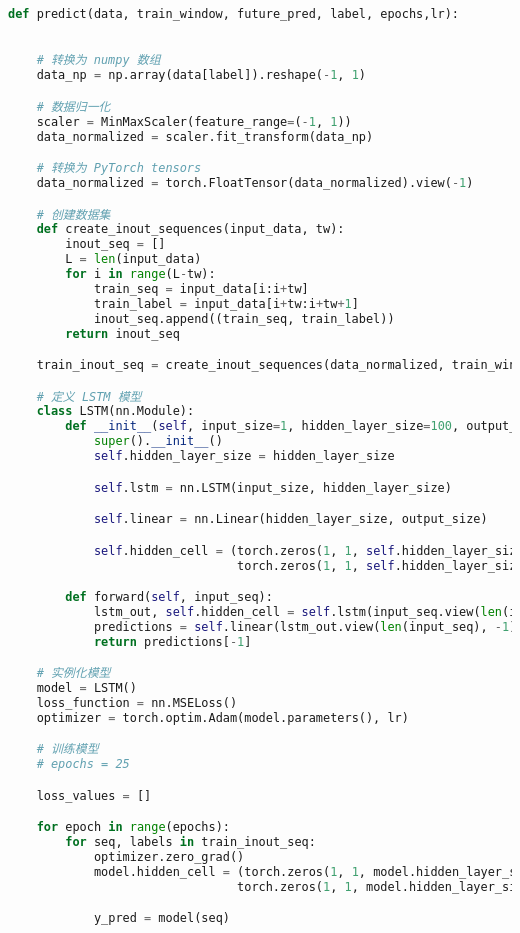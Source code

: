 \begin{lstlisting}[language=python,caption={数字农业渗透}]
def predict(data, train_window, future_pred, label, epochs,lr):

  
    # 转换为 numpy 数组
    data_np = np.array(data[label]).reshape(-1, 1)

    # 数据归一化
    scaler = MinMaxScaler(feature_range=(-1, 1))
    data_normalized = scaler.fit_transform(data_np)

    # 转换为 PyTorch tensors
    data_normalized = torch.FloatTensor(data_normalized).view(-1)

    # 创建数据集
    def create_inout_sequences(input_data, tw):
        inout_seq = []
        L = len(input_data)
        for i in range(L-tw):
            train_seq = input_data[i:i+tw]
            train_label = input_data[i+tw:i+tw+1]
            inout_seq.append((train_seq, train_label))
        return inout_seq

    train_inout_seq = create_inout_sequences(data_normalized, train_window)

    # 定义 LSTM 模型
    class LSTM(nn.Module):
        def __init__(self, input_size=1, hidden_layer_size=100, output_size=1):
            super().__init__()
            self.hidden_layer_size = hidden_layer_size

            self.lstm = nn.LSTM(input_size, hidden_layer_size)

            self.linear = nn.Linear(hidden_layer_size, output_size)

            self.hidden_cell = (torch.zeros(1, 1, self.hidden_layer_size),
                                torch.zeros(1, 1, self.hidden_layer_size))

        def forward(self, input_seq):
            lstm_out, self.hidden_cell = self.lstm(input_seq.view(len(input_seq), 1, -1), self.hidden_cell)
            predictions = self.linear(lstm_out.view(len(input_seq), -1))
            return predictions[-1]

    # 实例化模型
    model = LSTM()
    loss_function = nn.MSELoss()
    optimizer = torch.optim.Adam(model.parameters(), lr)

    # 训练模型
    # epochs = 25

    loss_values = [] 

    for epoch in range(epochs):
        for seq, labels in train_inout_seq:
            optimizer.zero_grad()
            model.hidden_cell = (torch.zeros(1, 1, model.hidden_layer_size),
                                torch.zeros(1, 1, model.hidden_layer_size))

            y_pred = model(seq)


\end{lstlisting}
